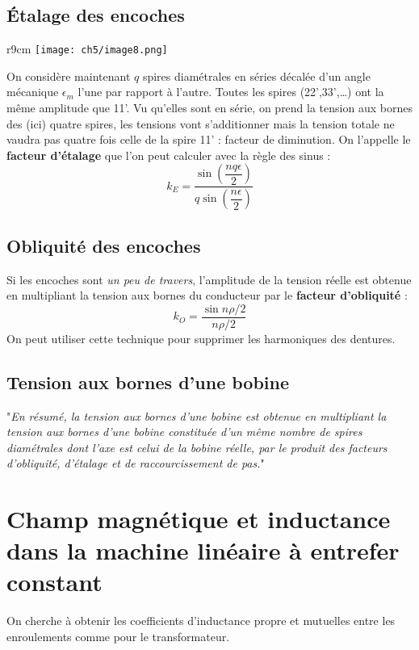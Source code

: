 	\subsection{Étalage des encoches}
	\begin{wrapfigure}[11]{r}{9cm}
	\vspace{-8mm}
	\texttt{[image: ch5/image8.png]}
	\end{wrapfigure}
	On considère maintenant $q$ spires diamétrales en séries décalée d'un angle mécanique
	$\epsilon_m$ l'une par rapport à l'autre. Toutes les spires (22',33',\dots) ont la 
	même amplitude que 11'. Vu qu'elles sont en série, on prend la tension aux bornes des 
	(ici) quatre spires, les tensions vont s'additionner mais la tension totale ne vaudra 
	pas quatre fois celle de la spire 11' : facteur de diminution. On l'appelle le 
	\textbf{facteur d'étalage} que l'on peut calculer avec la règle des sinus :
	\begin{equation}
	k_E = \dfrac{\sin\left(\dfrac{nq\epsilon}{2}\right)}{q\sin\left(\dfrac{n\epsilon}{2}
	\right)}
	\end{equation}
	
	\subsection{Obliquité des encoches}
	Si les encoches sont \textit{un peu de travers}, l'amplitude de la tension réelle 
	est obtenue en multipliant la tension aux bornes du conducteur par le \textbf{facteur 
	d'obliquité }:
	\begin{equation}
	k_O = \dfrac{\sin n\rho/2}{n\rho/2}
	\end{equation}
	On peut utiliser cette technique pour supprimer les harmoniques des dentures.
	
	\subsection{Tension aux bornes d'une bobine}
	"\textit{En résumé, la tension aux bornes d'une bobine est obtenue en multipliant la 
	tension aux bornes d'une bobine constituée d'un même nombre de spires diamétrales dont 
	l'axe est celui de la bobine réelle, par le produit des facteurs d'obliquité, d'étalage 
	et de raccourcissement de pas.}"
	
	
\section{Champ magnétique et inductance dans la machine linéaire à entrefer constant}
On cherche à obtenir les coefficients d'inductance propre et mutuelles entre les enroulements 
comme pour le transformateur.

